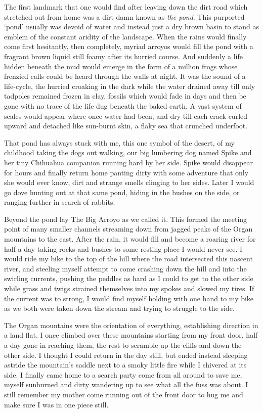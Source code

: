 \documentclass[ebook, 10pt, openright, onecolumn]{memoir}
\begin{document}
The first landmark that one would find after leaving down the dirt road which
stretched out from home was a dirt damn known as \textit{the pond}.  This
purported `pond' usually was devoid of water and instead just a dry brown basin
to stand as emblem of the constant aridity of the landscape.  When the rains
would finally come first hesitantly, then completely, myriad arroyos would fill
the pond with a fragrant brown liquid still foamy after its hurried course.  And
suddenly a life hidden beneath the mud would emerge in the form of a million
frogs whose frenzied calls could be heard through the walls at night.  It was
the sound of a life-cycle, the hurried croaking in the dark while the water
drained away till only tadpoles remained frozen in clay, fossils which would
fade in days and then be gone with no trace of the life dug beneath the baked
earth.  A vast system of scales would appear where once water had been, and dry
till each crack curled upward and detached like sun-burnt skin, a flaky sea
that crunched underfoot.

That pond has always stuck with me, this one symbol of the desert, of my
childhood taking the dogs out walking, our big lumbering dog named Spike and her
tiny Chihuahua companion running hard by her side.  Spike would disappear for
hours and finally return home panting dirty with some adventure that only she
would ever know, dirt and strange smells clinging to her sides.  Later I would
go dove hunting out at that same pond, hiding in the bushes on the side, or
ranging further in search of rabbits.

Beyond the pond lay The Big Arroyo as we called it.  This formed the meeting
point of many smaller channels streaming down from jagged peaks of the Organ
mountains to the east.  After the rain, it would fill and become a roaring river
for half a day taking rocks and bushes to some resting place I would never see.
I would ride my bike to the top of the hill where the road intersected this
nascent river, and steeling myself attempt to come crashing down the hill and
into the swirling currents, pushing the peddles as hard as I could to get to the
other side while grass and twigs strained themselves into my spokes and slowed
my tires.  If the current was to strong, I would find myself holding with one
hand to my bike as we both were taken down the stream and trying to struggle to
the side.

The Organ mountains were the orientation of everything, establishing direction
in a land flat.  I once climbed over these mountains starting from my front
door, half a day gone in reaching them, the rest to scramble up the cliffs and
down the other side.  I thought I could return in the day still, but ended
instead sleeping astride the mountain's saddle next to a smoky little fire while
I shivered at its side.  I finally came home to a search party come from all
around to save me, myself sunburned and dirty wandering up to see what all the
fuss was about.  I still remember my mother come running out of the front door
to hug me and make sure I was in one piece still.
\end{document}
